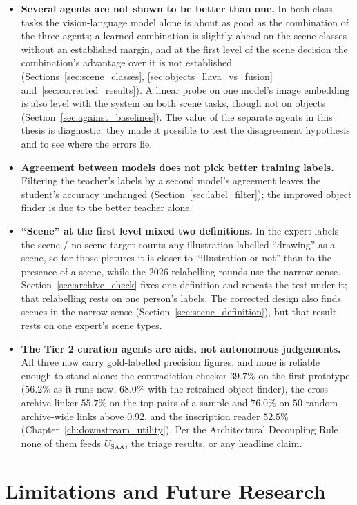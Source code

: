 \documentclass[12pt,a4paper]{report}
\begin{document}
\begin{itemize}
    \item \textbf{Several agents are not shown to be better than one.} In both class tasks the vision-language model alone is about as good as the combination of the three agents; a learned combination is slightly ahead on the scene classes without an established margin, and at the first level of the scene decision the combination's advantage over it is not established (Sections~\ref{sec:scene_classes}, \ref{sec:objects_llava_vs_fusion} and~\ref{sec:corrected_results}). A linear probe on one model's image embedding is also level with the system on both scene tasks, though not on objects (Section~\ref{sec:against_baselines}). The value of the separate agents in this thesis is diagnostic: they made it possible to test the disagreement hypothesis and to see where the errors lie.
    \item \textbf{Agreement between models does not pick better training labels.} Filtering the teacher's labels by a second model's agreement leaves the student's accuracy unchanged (Section~\ref{sec:label_filter}); the improved object finder is due to the better teacher alone.
    \item \textbf{``Scene'' at the first level mixed two definitions.} In the expert labels the scene / no-scene target counts any illustration labelled ``drawing'' as a scene, so for those pictures it is closer to ``illustration or not'' than to the presence of a scene, while the 2026 relabelling rounds use the narrow sense. Section~\ref{sec:archive_check} fixes one definition and repeats the test under it; that relabelling rests on one person's labels. The corrected design also finds scenes in the narrow sense (Section~\ref{sec:scene_definition}), but that result rests on one expert's scene types.
    \item \textbf{The Tier 2 curation agents are aids, not autonomous judgements.} All three now carry gold-labelled precision figures, and none is reliable enough to stand alone: the contradiction checker $39.7\%$ on the first prototype ($56.2\%$ as it runs now, $68.0\%$ with the retrained object finder), the cross-archive linker $55.7\%$ on the top pairs of a sample and $76.0\%$ on $50$ random archive-wide links above $0.92$, and the inscription reader $52.5\%$ (Chapter~\ref{ch:downstream_utility}). Per the Architectural Decoupling Rule none of them feeds $U_{\text{SAA}}$, the triage results, or any headline claim.
\end{itemize}

\section{Limitations and Future Research}
\label{sec:limitations}
\end{document}
